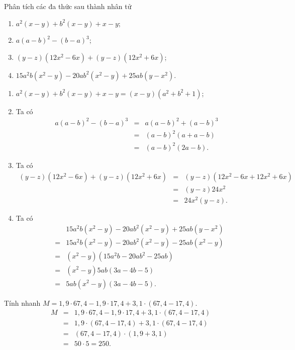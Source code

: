 	\begin{vn}
			Phân tích các đa thức sau thành nhân tử
		\begin{enumerate}
			\item $a^2(x-y)+b^2(x-y)+x-y$;
			\item $a(a-b)^2 -(b-a)^3$;
			\item $(y-z)(12x^2-6x)+(y-z)(12x^2+6x)$;
			\item $15a^2b(x^2-y)-20ab^2(x^2-y)+25ab(y-x^2)$.
		\end{enumerate}
		\loigiai
		{
			\begin{enumerate}
				\item $a^2(x-y)+b^2(x-y)+x-y=(x-y)(a^2+b^2+1)$;
				\item Ta có {\allowdisplaybreaks\begin{eqnarray*}
				a(a-b)^2 -(b-a)^3 &=& a(a-b)^2 +(a-b)^3 \\
				&=& (a-b)^2(a+a-b)\\
				&=& (a-b)^2(2a-b).
				\end{eqnarray*}}
				\item Ta có {\allowdisplaybreaks\begin{eqnarray*}
			(y-z)(12x^2-6x)+(y-z)(12x^2+6x) &=&(y-z)\left( 12x^2-6x+12x^2+6x\right)  \\
				&=& (y-z)24x^2\\
				&=& 24x^2 (y-z).
			\end{eqnarray*}}
		\item Ta có {\allowdisplaybreaks\begin{eqnarray*}
			&&15a^2b(x^2-y)-20ab^2(x^2-y)+25ab(y-x^2)\\ &=&15a^2b(x^2-y)-20ab^2(x^2-y)-25ab(x^2-y)  \\
			&=& (x^2-y)(15a^2b-20ab^2-25ab) \\
			&=& (x^2-y) 5 ab(3a-4b-5)\\
			&=& 5ab(x^2-y)(3a-4b-5).
		\end{eqnarray*}}
	\end{enumerate}
		}
	\end{vn}

\begin{vn}
	Tính nhanh $M=1,9\cdot 67,4-1,9\cdot17,4 +3,1\cdot(67,4-17,4)$.
	\loigiai
	{
	{\allowdisplaybreaks\begin{eqnarray*}
		M&=&1,9\cdot 67,4-1,9\cdot17,4 +3,1\cdot(67,4-17,4)\\
		&=& 1,9\cdot (67,4-17,4)+3,1\cdot(67,4-17,4) \\
		&=& (67,4-17,4) \cdot (1,9 +3,1)\\
		&=& 50 \cdot 5 = 250.
			\end{eqnarray*}}
	}
\end{vn}

